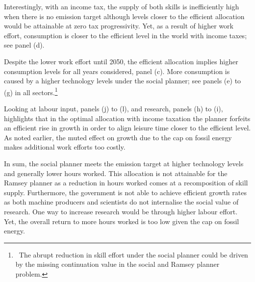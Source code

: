 Interestingly, with an income tax, the supply of both skills is inefficiently high when there is no emission target although levels closer to the efficient allocation would be attainable at zero tax progressivity. Yet, as a result of higher work effort, consumption is closer to the efficient level in the world with income taxes; see panel (d).

Despite the lower work effort until 2050, the efficient allocation implies higher consumption levels for all years considered, panel (c). More consumption is caused by a higher technology levels under the social planner; see panels (e) to (g) in all sectors.\footnote{\ The abrupt reduction in skill effort under the social planner could be driven by the missing continuation value in the social and Ramsey planner problem. }

Looking at labour input, panels (j) to (l), and research, panels (h) to (i), highlights that in the optimal allocation with income taxation the planner forfeits an efficient rise in growth in order to align leisure time closer to the efficient level. As noted earlier, the muted effect on growth due to the cap on fossil energy makes additional work efforts too costly. 

In sum, the social planner meets the emission target at higher technology levels and generally lower hours worked. This allocation is not attainable for the Ramsey planner as a reduction in hours worked comes at a recomposition of skill supply. Furthermore, the government is not able to achieve efficient growth rates as both machine producers and scientists do not internalise the social value of research.  One way to increase research would be through higher labour effort. Yet, the overall return to more hours worked is too low given the cap on fossil energy. 

